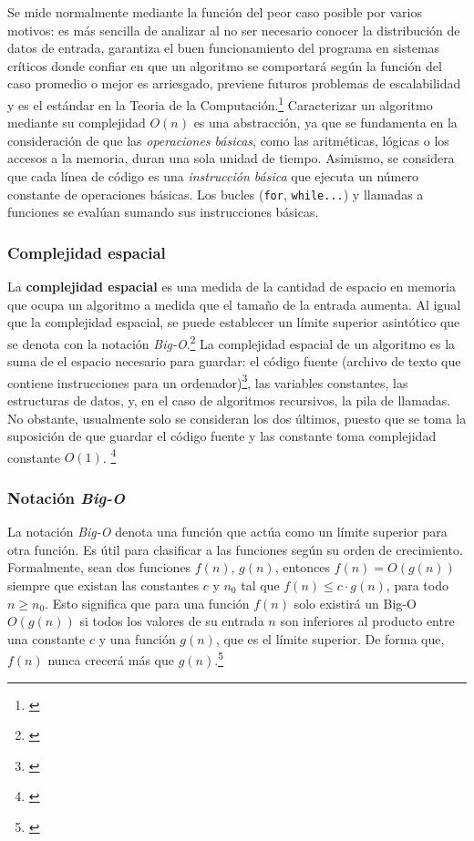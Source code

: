 \documentclass[titlepage]{article}
\begin{document}
Se mide normalmente mediante la función del peor caso posible por varios motivos: es más sencilla de analizar al no ser necesario conocer la distribución de datos de entrada, garantiza el buen funcionamiento del programa en sistemas críticos donde confiar en que un algoritmo se comportará según la función del caso promedio o mejor es arriesgado, previene futuros problemas de escalabilidad y es el estándar en la Teoria de la Computación.\footnote{\cite{Correa2024}} Caracterizar un algoritmo mediante su complejidad \(O(n)\) es una abstracción, ya que se fundamenta en la consideración de que las \textit{operaciones básicas}, como las aritméticas, lógicas o los accesos a la memoria, duran una sola unidad de tiempo. Asimismo, se considera que cada línea de código es una \textit{instrucción básica} que ejecuta un número constante de operaciones básicas. Los bucles (\lstinline|for|, \lstinline|while...|) y llamadas a funciones se evalúan sumando sus instrucciones básicas.

\subsubsection{Complejidad espacial}
La \textbf{complejidad espacial} es una medida de la cantidad de espacio en memoria que ocupa un algoritmo a medida que el tamaño de la entrada aumenta. Al igual que la complejidad espacial, se puede establecer un límite superior asintótico que se denota con la notación \textit{Big-O}.\footnote{\cite{singhhandbook}} 
La complejidad espacial de un algoritmo es la suma de el espacio necesario para guardar: el código fuente (archivo de texto que contiene instrucciones para un ordenador)\footnote{\cite{Santamaria2024}}, las variables constantes, las estructuras de datos, y, en el caso de algoritmos recursivos, la pila de llamadas. No obstante, usualmente solo se consideran los dos últimos, puesto que se toma la suposición de que guardar el código fuente y las constante toma complejidad constante \(O(1)\). \footnote{\cite{puntambekar2020analysis}}

\subsubsection{Notación \textit{Big-O}}
La notación \textit{Big-O} denota una función que actúa como un límite superior para otra función. Es útil para clasificar a las funciones según su orden de crecimiento. Formalmente, sean dos funciones \(f(n)\), \(g(n)\), entonces \(f(n) = O(g(n))\) siempre que existan las constantes \(c\) y \(n_0\) tal que \(f(n) \leq c\cdot g(n)\), para todo \(n \geq n_0\). Esto significa que para una función \(f(n)\) solo existirá un Big-O \(O(g(n))\) si todos los valores de su entrada \(n\) son inferiores al producto entre una constante \(c\) y una función \(g(n)\), que es el límite superior. De forma que, \(f(n)\) nunca crecerá más que \(g(n)\).\footnote{\cite{Sipser1997}}
\end{document}
